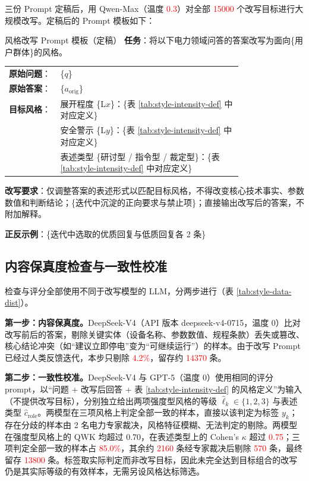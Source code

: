 \documentclass[fontset=fandol,type=master,campus=shenzhen,etitleauto=true]{hithesisbook}
\newcommand{\rev}[1]{\textcolor{red}{#1}}
\begin{document}
三份 Prompt 定稿后，用 Qwen-Max（温度 \rev{0.3}）对全部 \rev{15000} 个改写目标进行大规模改写。定稿后的 Prompt 模板如下：

\begin{promptbox}{风格改写 Prompt 模板（定稿）}
\textbf{任务}：将以下电力领域问答的答案改写为面向\{用户群体\}的风格。\par\smallskip
\begin{tabular}{@{}l@{\;}p{0.78\linewidth}@{}}
\textbf{原始问题}： & \{$q$\} \\
\textbf{原始答案}： & \{$a_{\text{orig}}$\} \\
\textbf{目标风格}： & 展开程度 \{L$x$\}：\{表 \ref{tab:style-intensity-def} 中对应定义\} \\
 & 安全警示 \{L$y$\}：\{表 \ref{tab:style-intensity-def} 中对应定义\} \\
 & 表述类型 \{研讨型 / 指令型 / 裁定型\}：\{表 \ref{tab:style-intensity-def} 中对应定义\} \\
\end{tabular}\par\smallskip
\textbf{改写要求}：仅调整答案的表述形式以匹配目标风格，不得改变核心技术事实、参数数值和判断结论；\{迭代中沉淀的正向要求与禁止项\}；直接输出改写后的答案，不附加解释。\par\smallskip
\textbf{正反示例}：\{迭代中选取的优质回复与低质回复各 2 条\}
\end{promptbox}

\subsection{内容保真度检查与一致性校准}\label{ux4e09ux8f6eux8d28ux91cfux7b5bux9009}

检查与评分全部使用不同于改写模型的 LLM，分两步进行（表 \ref{tab:style-data-dist}）。

\textbf{第一步：内容保真度。}DeepSeek-V4（API 版本 deepseek-v4-0715，温度 0）比对改写前后的答案，剔除关键实体（设备名称、参数数值、规程条款）丢失或篡改、核心结论冲突（如“建议立即停电”变为“可继续运行”）的样本。由于改写 Prompt 已经过人类反馈迭代，本步只剔除 \rev{4.2\%}，留存约 \rev{14370} 条。

\textbf{第二步：一致性校准。}DeepSeek-V4 与 GPT-5（温度 0）使用相同的评分 prompt，以“问题 + 改写后回答 + 表 \ref{tab:style-intensity-def} 的风格定义”为输入（不提供改写目标），分别独立给出两项强度型风格的等级 $\hat{\ell}_k \in \{1, 2, 3\}$ 与表述类型 $\hat{c}_{\text{role}}$。两模型在三项风格上判定全部一致的样本，直接以该判定为标签 $y_k$；存在分歧的样本由 2 名电力专家裁决，风格特征模糊、无法判定的剔除。两模型在强度型风格上的 QWK 均超过 0.70，在表述类型上的 Cohen's $\kappa$ 超过 \rev{0.75}；三项判定全部一致的样本占 \rev{85.0\%}，其余约 \rev{2160} 条经专家裁决后剔除 \rev{570} 条，最终留存 \rev{13800} 条。标签取实际判定而非改写目标，因此未完全达到目标组合的改写仍是其实际等级的有效样本，无需另设风格达标筛选。
\end{document}
